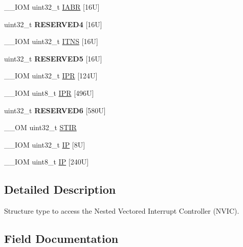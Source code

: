\begin{DoxyCompactItemize}
\item 
\+\_\+\+\_\+\+I\+OM uint32\+\_\+t \hyperlink{struct_n_v_i_c___type_a6e42ca3d9a1e12e75463cef68785d533}{I\+A\+BR} \mbox{[}16\+U\mbox{]}
\item 
\mbox{\label{struct_n_v_i_c___type_ab7e7cff95dfc1edc0c0dcce4e8345a6a}} 
uint32\+\_\+t {\bfseries R\+E\+S\+E\+R\+V\+E\+D4} \mbox{[}16\+U\mbox{]}
\item 
\+\_\+\+\_\+\+I\+OM uint32\+\_\+t \hyperlink{struct_n_v_i_c___type_a4940c96f11d1c95d95a28e388f04d6d6}{I\+T\+NS} \mbox{[}16\+U\mbox{]}
\item 
\mbox{\label{struct_n_v_i_c___type_ae71fe7b11f01c3702aa6253b5309bbf9}} 
uint32\+\_\+t {\bfseries R\+E\+S\+E\+R\+V\+E\+D5} \mbox{[}16\+U\mbox{]}
\item 
\+\_\+\+\_\+\+I\+OM uint32\+\_\+t \hyperlink{struct_n_v_i_c___type_a71598b2d46c2fa6708a7908a1c63c43c}{I\+PR} \mbox{[}124\+U\mbox{]}
\item 
\+\_\+\+\_\+\+I\+OM uint8\+\_\+t \hyperlink{struct_n_v_i_c___type_adfd45d2d45654c4e775017800f33e9a3}{I\+PR} \mbox{[}496\+U\mbox{]}
\item 
\mbox{\label{struct_n_v_i_c___type_ad91f19091b4eecbe7322cdb36fad41c8}} 
uint32\+\_\+t {\bfseries R\+E\+S\+E\+R\+V\+E\+D6} \mbox{[}580\+U\mbox{]}
\item 
\+\_\+\+\_\+\+OM uint32\+\_\+t \hyperlink{struct_n_v_i_c___type_a37de89637466e007171c6b135299bc75}{S\+T\+IR}
\item 
\+\_\+\+\_\+\+I\+OM uint32\+\_\+t \hyperlink{struct_n_v_i_c___type_a4eef47929a0d1317a107f1ac62e28464}{IP} \mbox{[}8\+U\mbox{]}
\item 
\+\_\+\+\_\+\+I\+OM uint8\+\_\+t \hyperlink{struct_n_v_i_c___type_a9a4341692e45d089a113986a3d344e98}{IP} \mbox{[}240\+U\mbox{]}
\end{DoxyCompactItemize}


\subsection{Detailed Description}
Structure type to access the Nested Vectored Interrupt Controller (N\+V\+IC). 

\subsection{Field Documentation}
\mbox{\label{struct_n_v_i_c___type_a6e42ca3d9a1e12e75463cef68785d533}} 
